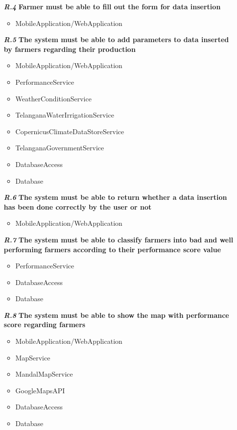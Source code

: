 \begin{itemize}
\item [\textbf{\textit{R.4}}] \textbf{Farmer must be able to fill out the form for data insertion}
   \begin{itemize}
     \item MobileApplication/WebApplication
\end{itemize}   

\item [\textbf{\textit{R.5}}] \textbf{The system must be able to add parameters to data inserted by farmers regarding their production}
   \begin{itemize}
     \item MobileApplication/WebApplication
     \item PerformanceService
     \item WeatherConditionService
     \item TelanganaWaterIrrigationService
    \item CopernicusClimateDataStoreService
    \item TelanganaGovernmentService
    \item DatabaseAccess
    \item Database
\end{itemize}    

\item [\textbf{\textit{R.6}}] \textbf{The system must be able to return whether a data insertion has been done correctly by the user or not}
        \begin{itemize}
            \item MobileApplication/WebApplication
        \end{itemize}
        
\item [\textbf{\textit{R.7}}] \textbf{The system must be able to classify farmers into bad and well performing farmers according to their performance score value}
   \begin{itemize}
     \item PerformanceService
     \item DatabaseAccess
     \item Database
\end{itemize}    

\item [\textbf{\textit{R.8}}] \textbf{The system must be able to show the map with performance score regarding farmers}
   \begin{itemize}
     \item MobileApplication/WebApplication
     \item MapService
     \item MandalMapService
     \item GoogleMapsAPI
     \item DatabaseAccess
     \item Database
\end{itemize}    


\end{itemize}
